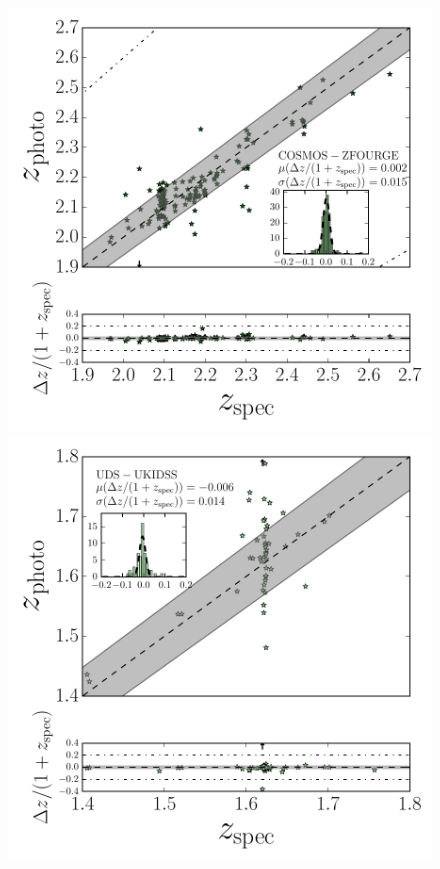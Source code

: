 \documentclass[iop]{emulateapj}
\begin{document}
\begin{figure}
\includegraphics[trim = 15 0 5 5, clip, scale=0.62]{figures/specz_vs_photo_z_COSMOS_v3.1.pdf}
\includegraphics[trim = 15 0 5 5, clip, scale=0.62]{figures/specz_vs_photo_z_UDS.pdf}

\end{figure}
\end{document}
